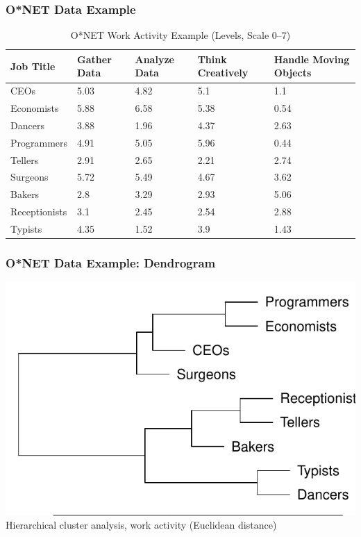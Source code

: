 \documentclass[red]{beamer}
\begin{document}
\begin{frame}
\frametitle{O*NET Data Example}
\begin{table}[htbp]
\begin{tabular}{|p{2cm}|p{1.65cm}|p{1.5cm}|p{1.5cm}|p{1.5cm}|}
\hline
{Job Title} & {Gather Data} & {Analyze Data} & {\small Think Creatively} & {Handle Moving Objects} \\ \hline
{CEOs} & 5.03 & 4.82 & 5.1 & 1.1  \\ \hline
{Economists} & 5.88 & 6.58 & 5.38 & 0.54 \\ \hline
{Dancers} & 3.88 & 1.96 & 4.37 & 2.63 \\ \hline
{Programmers} & 4.91 & 5.05 & 5.96 & 0.44 \\ \hline
{Tellers} & 2.91 & 2.65 & 2.21 & 2.74 \\ \hline
{Surgeons} & 5.72 & 5.49 & 4.67 & 3.62 \\ \hline
{Bakers} & 2.8 & 3.29 & 2.93 & 5.06 \\ \hline
{Receptionists} & 3.1 & 2.45 & 2.54 & 2.88 \\ \hline
{Typists} & 4.35 & 1.52 & 3.9 & 1.43 \\ \hline
\end{tabular}
\caption{O*NET Work Activity Example (Levels, Scale 0--7)}
\label{onetex}
\end{table}
\end{frame}

\begin{frame}
  \frametitle{O*NET Data Example: Dendrogram}
  \begin{center}
  \includegraphics[width=\textwidth]{slides/example_cluster.pdf} \\
  Hierarchical cluster analysis, work activity (Euclidean distance)
  \end{center}
\end{frame}
\end{document}
